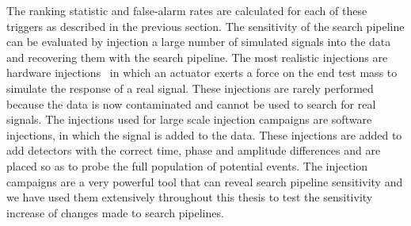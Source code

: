 The ranking statistic and false-alarm rates are calculated for each of these triggers as described in the previous section. The sensitivity of the search pipeline can be evaluated by injection a large number of simulated \gwadj signals into the data and recovering them with the search pipeline. The most realistic injections are hardware injections~\cite{Brown:2003, Biwer:2016} in which an actuator exerts a force on the end test mass to simulate the response of a real \gwadj signal. These injections are rarely performed because the data is now contaminated and cannot be used to search for real \gwadj signals. The injections used for large scale injection campaigns are software injections, in which the \gwadj signal is added to the data. These injections are added to add detectors with the correct time, phase and amplitude differences and are placed so as to probe the full population of potential \gwadj events. The injection campaigns are a very powerful tool that can reveal search pipeline sensitivity and we have used them extensively throughout this thesis to test the sensitivity increase of changes made to search pipelines.
